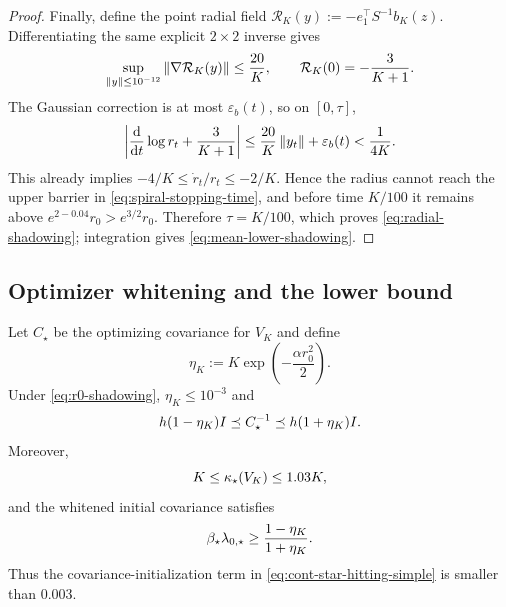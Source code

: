 \begin{proof}
Finally, define the point radial field
$\mathcal R_K(y):=-e_1^\top S^{-1}b_K(z)$.  Differentiating the same explicit $2\times2$ inverse
gives
\[
 \sup_{\left\lVert y\right\rVert\leq10^{-12}}\left\lVert \nabla\mathcal R_K(y)\right\rVert
 \leq\frac{20}{K},
 \qquad
 \mathcal R_K(0)=-\frac3{K+1}.
\]
The Gaussian correction is at most $\varepsilon_b(t)$, so on $[0,\tau]$,
\[
 \left|\frac{\mathrm{d}}{\mathrm{d} t}\log r_t+\frac3{K+1}\right|
 \leq\frac{20}{K}\left\lVert y_t\right\rVert+\varepsilon_b(t)
 <\frac1{4K}.
\]
This already implies $-4/K\leq\dot r_t/r_t\leq-2/K$.  Hence the radius cannot reach the upper
barrier in \eqref{eq:spiral-stopping-time}, and before time $K/100$ it remains above
$e^{2-0.04}r_0>e^{3/2}r_0$.  Therefore $\tau=K/100$, which proves
\eqref{eq:radial-shadowing}; integration gives \eqref{eq:mean-lower-shadowing}.
\end{proof}

\subsection{Optimizer whitening and the lower bound}

\begin{lemma}
\label{lem:spiral-kappa-star}
Let $C_\star$ be the optimizing covariance for $V_K$ and define
\[
    \eta_K:=K\exp\left(-\frac{\alpha r_0^2}{2}\right).
\]
Under \eqref{eq:r0-shadowing}, $\eta_K\leq10^{-3}$ and
\begin{equation}
\label{eq:spiral-Pstar}
    h(1-\eta_K)I
    \preceq
    C_\star^{-1}
    \preceq
    h(1+\eta_K)I.
\end{equation}
Moreover,
\begin{equation}
\label{eq:spiral-kappa-star}
    K\leq\kappa_\star(V_K)\leq1.03K,
\end{equation}
and the whitened initial covariance satisfies
\begin{equation}
\label{eq:spiral-initial-product}
    \beta_\star\lambda_{0,\star}
    \geq\frac{1-\eta_K}{1+\eta_K}.
\end{equation}
Thus the covariance-initialization term in \eqref{eq:cont-star-hitting-simple} is smaller than
$0.003$.
\end{lemma}

